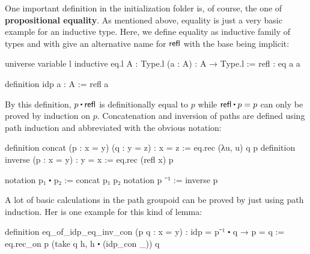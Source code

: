 One important definition in the initialization folder is, of course, the one of
\textbf{propositional equality}.
As mentioned above, equality is just a very basic example for an inductive type.
Here, we define equality as inductive family of types  and with 
give an alternative name for $\mathsf{refl}$ with the base being implicit:
\begin{leancode}
universe variable l
inductive eq.{l} {A : Type.{l}} (a : A) : A → Type.{l} :=
refl : eq a a

definition idp {a : A} := refl a
\end{leancode}
By this definition, $p \ct \refl$ is definitionally equal to $p$ while $\refl \ct p = p$
can only be proved by induction on $p$.
Concatenation and inversion of paths are defined using path induction and abbreviated
with the obvious notation:
\begin{leancode}
definition concat (p : x = y) (q : y = z) : x = z := eq.rec (λu, u) q p
definition inverse (p : x = y) : y = x := eq.rec (refl x) p

notation p₁ ⬝ p₂ := concat p₁ p₂
notation p ⁻¹ := inverse p
\end{leancode}
A lot of basic calculations in the path groupoid can be proved by just using
path induction. Her is one example for this kind of lemma:
\begin{leancode}
definition eq_of_idp_eq_inv_con (p q : x = y) : idp = p⁻¹ ⬝ q → p = q :=
eq.rec_on p (take q h, h ⬝ (idp_con _)) q
\end{leancode}


